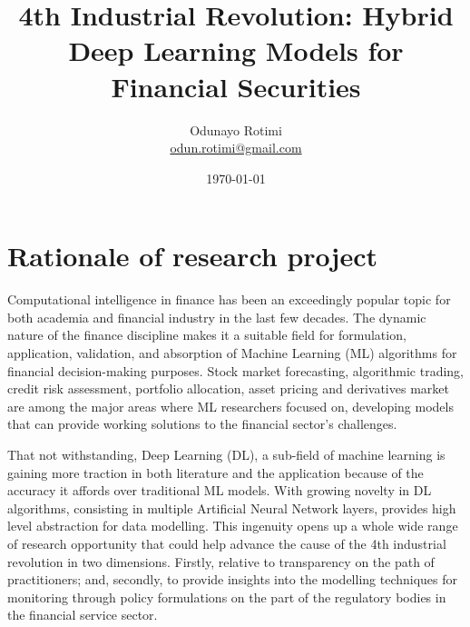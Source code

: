 \documentclass[a4paper,11pt]{scrartcl}
\title{4th Industrial Revolution: Hybrid Deep Learning Models for Financial Securities}
\author{Odunayo Rotimi\\ \url{odun.rotimi@gmail.com}}
\date{\today}
\begin{document}
\maketitle


%
\section{Rationale of research project}
Computational intelligence in finance has been an exceedingly popular topic for both academia and financial
industry in the last few decades. The dynamic nature of the finance discipline makes it a suitable field for
formulation, application, validation, and absorption of Machine Learning (ML) algorithms for financial
decision-making purposes. Stock market forecasting, algorithmic trading, credit risk assessment,
portfolio allocation, asset pricing and derivatives market are among the major areas where ML researchers
focused on, developing models that can provide working solutions to the financial sector's challenges.
\newline

That not withstanding, Deep Learning (DL), a sub-field of machine learning is gaining more traction in both
literature and the application because of the accuracy it affords over traditional ML models. With growing
novelty in DL algorithms, consisting in multiple Artificial Neural Network layers, provides high level
abstraction for data modelling. This ingenuity opens up a whole wide range of research opportunity that
could help advance the cause of the 4th industrial revolution in two dimensions. Firstly, relative to
transparency on the path of practitioners; and, secondly, to provide insights into the modelling techniques
for monitoring through policy formulations on the part of the regulatory bodies in the financial service sector.


%
\end{document}
